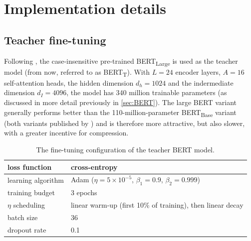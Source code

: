 \documentclass[bsc,frontabs,twoside,singlespacing,parskip,deptreport]{infthesis}
\def\BERTT{BERT\textsubscript{T}}
\begin{document}
{  \section{Implementation details}{
    \label{sec:implementation-details}
    \subsection{Teacher fine-tuning}{
      Following \citet{Tang_2019b}, the case-insensitive pre-trained BERT\textsubscript{Large} is used as the teacher model (from now, referred to as \BERTT).
      With $L=24$ encoder layers, $A=16$ self-attention heads, the hidden dimension $d_h=1024$ and the indermediate dimension $d_I=4096$, the model has 340 million trainable parameters (as discussed in more detail previously in \autoref{sec:BERT}).
      The large BERT variant generally performs better than the 110-million-parameter BERT\textsubscript{Base} variant (both variants published by \citet{Devlin_2018}) and is therefore more attractive, but also slower, with a greater incentive for compression.

      \begin{table}[h!t]
      \centering
      \begin{tabular}{m{}|m{}}
      \hline
      loss function & cross-entropy \\
      \hline
      learning algorithm & Adam ($\eta=5\times10^{-5}$, $\beta_1=0.9$, $\beta_2=0.999$) \\
      \hline
      training budget & 3 epochs \\
      \hline
      $\eta$ scheduling & linear warm-up (first 10\% of training), then linear decay \\
      \hline
      batch size & 36 \\
      \hline
      dropout rate & 0.1 \\
      \hline
      \end{tabular}
      \caption{The fine-tuning configuration of the teacher BERT model.}
      \label{tab:initial-config-teacher}
      \end{table}

}}}
\end{document}
